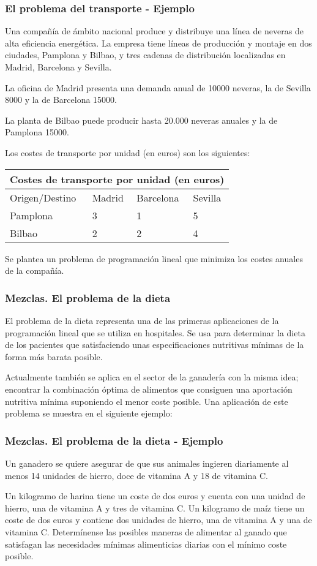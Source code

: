 \documentclass{beamer}
\begin{document}
\begin{frame}
\frametitle{El problema del transporte - Ejemplo}
Una compa\~n\'ia de \'ambito nacional produce y distribuye  una l\'inea de neveras de alta eficiencia energ\'etica. La empresa tiene l\'ineas de producci\'on y montaje en dos ciudades, Pamplona y Bilbao, y tres cadenas de distribuci\'on localizadas en Madrid, Barcelona y Sevilla.

La oficina de Madrid presenta una demanda anual de 10000 neveras, la de Sevilla 8000 y la de Barcelona 15000.

La planta de Bilbao puede producir hasta 20.000 neveras anuales y la de Pamplona 15000. 

Los costes de transporte por unidad (en euros) son los siguientes:

\begin{tabular}{ |p{2.5cm}||p{2.3cm}|p{2.3cm}|p{2.3cm}|  }
 \hline
 \multicolumn{4}{|c|}{Costes de transporte por unidad (en euros)} \\
 \hline
 Origen/Destino& Madrid &Barcelona&Sevilla\\
 \hline
 Pamplona   & 3    &1&   5\\
 Bilbao &   2  & 2   &4\\
 \hline
\end{tabular}
Se plantea un problema de programaci\'on lineal que minimiza los costes anuales de la compa\~n\'ia.
\end{frame}

\begin{frame}
\frametitle{Mezclas. El problema de la dieta}
El problema de la dieta representa una de las primeras aplicaciones de la programaci\'on lineal que se utiliza en hospitales. Se usa para determinar la dieta de los pacientes que satisfaciendo unas especificaciones nutritivas m\'inimas de la forma m\'as barata posible.

Actualmente tambi\'en se aplica en el sector de la ganader\'ia con la misma idea; encontrar la combinaci\'on \'optima de alimentos que consiguen una aportaci\'on nutritiva m\'inima suponiendo el menor coste posible. Una aplicaci\'on de este problema se muestra en el siguiente ejemplo:
\end{frame}


\begin{frame}
\frametitle{Mezclas. El problema de la dieta - Ejemplo}
Un ganadero se quiere asegurar de que sus animales ingieren diariamente al menos 14 unidades de hierro, doce de vitamina A y 18 de vitamina C.

Un kilogramo de harina tiene un coste de dos euros y cuenta con una unidad de hierro, una de vitamina A y tres de vitamina C. Un kilogramo de ma\'iz tiene un coste de dos euros y contiene dos unidades de hierro, una de vitamina A y una de vitamina C.
Determ\'inense las posibles maneras de alimentar al ganado que satisfagan las necesidades m\'inimas alimenticias diarias con el m\'inimo coste posible.
\end{frame}
\end{document}
